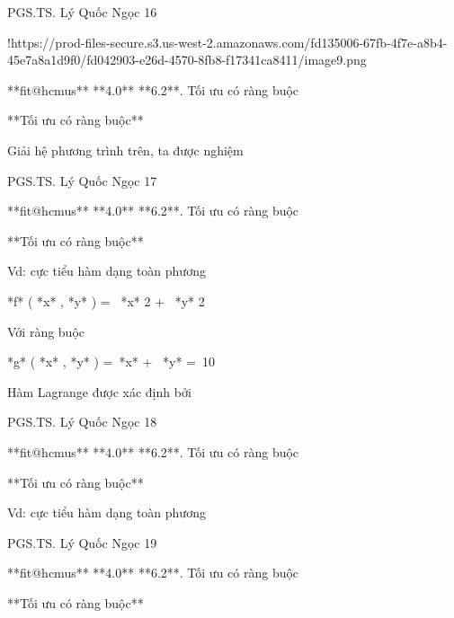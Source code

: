 PGS.TS. Lý Quốc Ngọc 16

!https://prod-files-secure.s3.us-west-2.amazonaws.com/fd135006-67fb-4f7e-a8b4-45e7a8a1d9f0/fd042903-e26d-4570-8fb8-f17341ca8411/image9.png

**fit@hcmus** **4.0** **6.2**. Tối ưu có ràng buộc

**Tối ưu có ràng buộc**

Giải hệ phương trình trên, ta được nghiệm


PGS.TS. Lý Quốc Ngọc 17

**fit@hcmus** **4.0** **6.2**. Tối ưu có ràng buộc

**Tối ưu có ràng buộc**

Vd: cực tiểu hàm dạng toàn phương

*f* ( *x* , *y* ) =  *x* 2 +  *y* 2

Với ràng buộc

*g* ( *x* , *y* ) = *x* +  *y* = 10

Hàm Lagrange được xác định bởi


PGS.TS. Lý Quốc Ngọc 18

**fit@hcmus** **4.0** **6.2**. Tối ưu có ràng buộc

**Tối ưu có ràng buộc**

Vd: cực tiểu hàm dạng toàn phương










PGS.TS. Lý Quốc Ngọc 19

**fit@hcmus** **4.0** **6.2**. Tối ưu có ràng buộc

**Tối ưu có ràng buộc**






